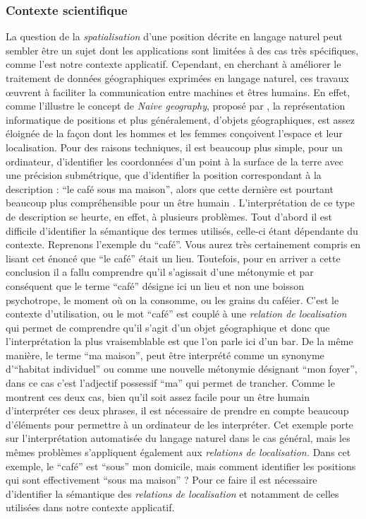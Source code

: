 \subsubsection{Contexte scientifique}

La question de la \emph{spatialisation} d'une position décrite en
langage naturel peut sembler être un sujet dont les applications sont
limitées à des cas très spécifiques, comme l'est notre contexte
applicatif. Cependant, en cherchant à améliorer le traitement de
données géographiques exprimées en langage naturel, ces travaux
œuvrent à faciliter la communication entre machines et êtres
humains. En effet, comme l'illustre le concept de \emph{Naive
  geography}, proposé par \textcite{Egenhofer1995}, la représentation
informatique de positions et plus généralement, d'objets
géographiques, est assez éloignée de la façon dont les hommes et les
femmes conçoivent l'espace et leur localisation. Pour des raisons
techniques, il est beaucoup plus simple, pour un ordinateur,
d'identifier les coordonnées d'un point à la surface de la terre avec
une précision submétrique, que d'identifier la position correspondant
à la description : \enquote{le café sous ma maison}, alors que cette
dernière est pourtant beaucoup plus compréhensible pour un être humain
\autocite{Duchene2019}. L'interprétation de ce type de description se
heurte, en effet, à plusieurs problèmes. Tout d'abord il est difficile
d'identifier la sémantique des termes utilisés, celle-ci étant
dépendante du contexte. Reprenons l'exemple du \enquote{café}. Vous
aurez très certainement compris en lisant cet énoncé que \enquote{le
  café} était un lieu. Toutefois, pour en arriver a cette conclusion
il a fallu comprendre qu'il s'agissait d'une métonymie et par
conséquent que le terme \enquote{café} désigne ici un lieu et non une
boisson psychotrope, le moment où on la consomme, ou les grains du
caféier. C'est le contexte d’utilisation, ou le mot \enquote{café} est
couplé à une \emph{relation de localisation} qui permet de comprendre
qu'il s'agit d'un objet géographique et donc que l'interprétation la
plus vraisemblable est que l'on parle ici d'un bar. De la même
manière, le terme \enquote{ma maison}, peut être interprété comme un
synonyme d'\enquote{habitat individuel} ou comme une nouvelle
métonymie désignant \enquote{mon foyer}, dans ce cas c'est l'adjectif
possessif \enquote{ma} qui permet de trancher. Comme le montrent ces
deux cas, bien qu'il soit assez facile pour un être humain
d'interpréter ces deux phrases, il est nécessaire de prendre en compte
beaucoup d'éléments pour permettre à un ordinateur de les
interpréter. Cet exemple porte sur l'interprétation automatisée du
langage naturel dans le cas général, mais les mêmes problèmes
s'appliquent également aux \emph{relations de localisation.} Dans cet
exemple, le \enquote{café} est \enquote{sous} mon domicile, mais
comment identifier les positions qui sont effectivement \enquote{sous
  ma maison} ? Pour ce faire il est nécessaire d'identifier la
sémantique des \emph{relations de localisation} et notamment de celles
utilisées dans notre contexte applicatif.

